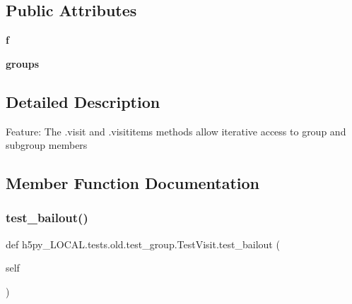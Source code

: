 \subsection*{Public Attributes}
\begin{DoxyCompactItemize}
\item 
\mbox{\label{classh5py__LOCAL_1_1tests_1_1old_1_1test__group_1_1TestVisit_a7d31581e0770df2319d78788f3abe13f}} 
{\bfseries f}
\item 
\mbox{\label{classh5py__LOCAL_1_1tests_1_1old_1_1test__group_1_1TestVisit_a2fe0a90ba3f23fb3fde5cd9bc7c2414c}} 
{\bfseries groups}
\end{DoxyCompactItemize}


\subsection{Detailed Description}
\begin{DoxyVerb}    Feature: The .visit and .visititems methods allow iterative access to
    group and subgroup members
\end{DoxyVerb}
 

\subsection{Member Function Documentation}
\mbox{\label{classh5py__LOCAL_1_1tests_1_1old_1_1test__group_1_1TestVisit_a4fdd9182b725b515dff5b010011ffea3}} 
\subsubsection{\texorpdfstring{test\+\_\+bailout()}{test\_bailout()}}
{\footnotesize\ttfamily def h5py\+\_\+\+L\+O\+C\+A\+L.\+tests.\+old.\+test\+\_\+group.\+Test\+Visit.\+test\+\_\+bailout (\begin{DoxyParamCaption}\item[{}]{self }\end{DoxyParamCaption})}

